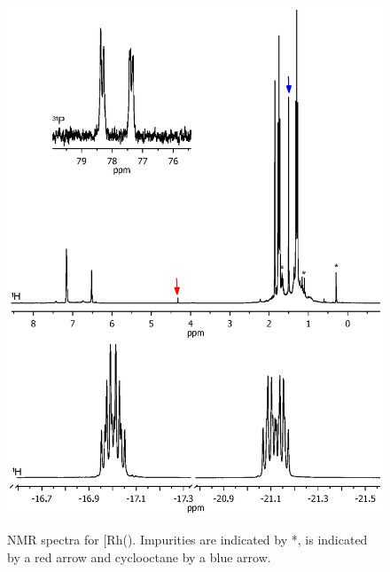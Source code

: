 \begin{figure}[htbp]
\begin{center}
\vspace{0.5cm}
\includegraphics[trim = 2.5cm 8.5cm 2.5cm 0cm, clip]{../NMR/7006E.eps}
\caption[NMR spectra for \ce{[Rh(\tButhixantphos)Cl(H)2]}]{NMR spectra for \texorpdfstring{[Rh(\tButhixantphos)\ce{Cl(H)2]}} R.  Impurities are indicated by *,  is indicated by a red arrow and cyclooctane by a blue arrow.}
\vspace{0.2cm}
\label{rhodiumhydridenmr}
\end{center}
\end{figure}
\vspace{0.2cm}

